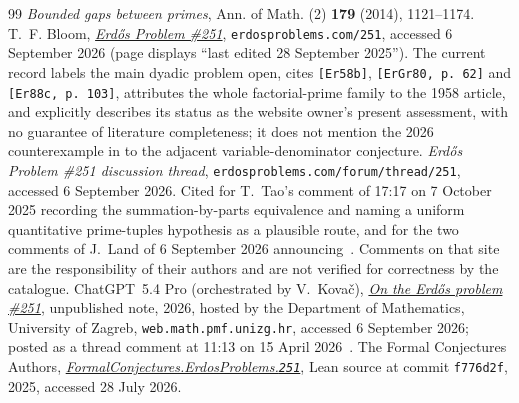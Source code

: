 \documentclass[11pt]{article}
\begin{document}
\begin{thebibliography}{99}
  {\emph{Bounded gaps between primes}},
  Ann. of Math. (2) \textbf{179} (2014), 1121--1174.
 T.~F. Bloom,
  \href{https://www.erdosproblems.com/251}{\emph{Erd\H{o}s Problem \#251}},
  \texttt{erdosproblems.com/251}, accessed 6 September 2026 (page displays
  ``last edited 28 September 2025'').  The current record labels the main
  dyadic problem open, cites \texttt{[Er58b]}, \texttt{[ErGr80, p.~62]} and
  \texttt{[Er88c, p.~103]}, attributes the whole factorial-prime family to the
  1958 article, and explicitly describes its status as the website owner's
  present assessment, with no guarantee of literature completeness; it does
  not mention the 2026 counterexample in \cite{kovac2026} to the adjacent
  variable-denominator conjecture.
 \emph{Erd\H{o}s Problem \#251 discussion
  thread}, \texttt{erdosproblems.com/forum/thread/251}, accessed 6 September
  2026.  Cited for T.~Tao's comment of 17:17 on 7 October 2025 recording the
  summation-by-parts equivalence and naming a uniform quantitative prime-tuples
  hypothesis as a plausible route, and for the two comments of J.~Land of
  6 September 2026 announcing~\cite{land2026}.  Comments on that site are the
  responsibility of their authors and are not verified for correctness by the
  catalogue.
 ChatGPT~5.4 Pro (orchestrated by V.~Kova\v{c}),
  \href{https://web.math.pmf.unizg.hr/~vjekovac/files/Erdos_problem_251.pdf}
  {\emph{On the Erd\H{o}s problem \#251}},
  unpublished note, 2026, hosted by the Department of Mathematics, University
  of Zagreb, \texttt{web.math.pmf.unizg.hr}, accessed 6 September 2026; posted
  as a thread comment at 11:13 on 15 April 2026~\cite{erdosproblems251thread}.
 The Formal Conjectures Authors,
  \href{https://github.com/google-deepmind/formal-conjectures/blob/f776d2f2039351b00737ffcafb9d7d7666e1d9af/FormalConjectures/ErdosProblems/251.lean}
  {\emph{FormalConjectures.ErdosProblems.\texttt{251}}},
  Lean source at commit \texttt{f776d2f}, 2025, accessed 28 July 2026.
\end{thebibliography}
\end{document}

